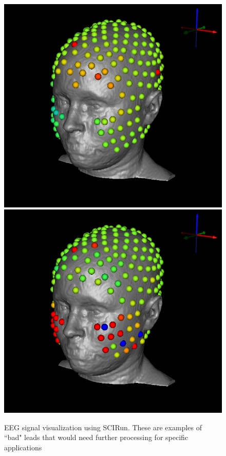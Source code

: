 \begin{figure}[H]
\begin{center}
\includegraphics[width=.49\textwidth]{Figures/eeg_1}
\includegraphics[width=.49\textwidth]{Figures/eeg_2}
\caption{EEG signal visualization using SCIRun. These are examples of ``bad" leads that would need further processing for specific applications}
\label{fig:eegvis}
\end{center}
\end{figure}